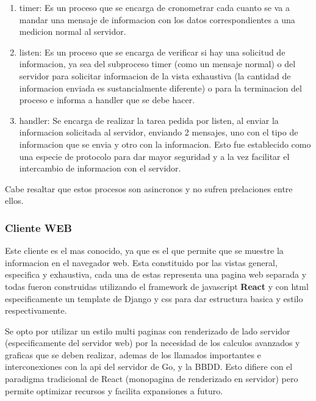 \begin{itemize}
        \begin{enumerate}
            \item timer: Es un proceso que se encarga de cronometrar cada cuanto
                se va a mandar una mensaje de informacion con los datos
                correspondientes a una medicion normal al servidor.

            \item listen: Es un proceso que se encarga de verificar si hay una
                solicitud de informacion, ya sea del subproceso timer (como un
                mensaje normal) o del servidor para solicitar informacion de la
                vista exhaustiva (la cantidad de informacion enviada es sustancialmente
                diferente) o para la terminacion del proceso e informa a handler
                que se debe hacer.

            \item handler: Se encarga de realizar la tarea pedida por listen,
                al enviar la informacion solicitada al servidor, enviando 2 mensajes,
                uno con el tipo de informacion que se envia y otro con la informacion.
                Esto fue establecido como una especie de protocolo para dar mayor
                seguridad y a la vez facilitar el intercambio de informacion con
                el servidor.
        \end{enumerate}

        Cabe resaltar que estos procesos son asincronos y no sufren prelaciones
        entre ellos.
\end{itemize}

\subsubsection{Cliente WEB}

Este cliente es el mas conocido, ya que es el que permite que se muestre la
informacion en el navegador web. Esta constituido por las vistas general,
especifica y exhaustiva, cada una de estas representa una pagina web separada y
todas fueron construidas utilizando el framework de javascript \textbf{React}
y con html especificamente un template de Django y css para dar estructura
basica y estilo respectivamente.

Se opto por utilizar un
estilo multi paginas con renderizado de lado servidor (especificamente del
servidor web) por la necesidad de los calculos avanzados y graficas que
se deben realizar, ademas de los llamados importantes e interconexiones con la
api del servidor de Go, y la BBDD. Esto difiere con el paradigma tradicional de
React (monopagina de renderizado en servidor) pero permite optimizar recursos y
facilita expansiones a futuro.

